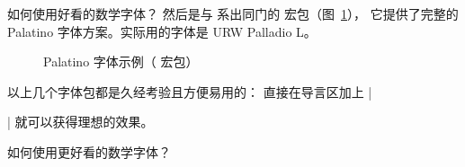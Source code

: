 \begin{myQA}{如何使用好看的数学字体？}
	然后是与  系出同门的 
	 宏包（图~\ref{Fig:pxfonts}），
	它提供了完整的 Palatino 字体方案。实际用的字体是 URW Palladio L。
	
	\begin{figure}[h]
		\centering
		\caption{Palatino 字体示例（ 宏包）}
		\label{Fig:pxfonts}
	\end{figure}
	
	以上几个字体包都是久经考验且方便易用的：
	直接在导言区加上 \code|\usepackage{(|\optional{宏包名}|)}|
	就可以获得理想的效果。
\end{myQA}

\begin{myQA}{如何使用更好看的数学字体？}
\end{myQA}